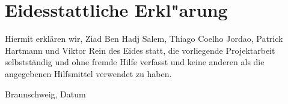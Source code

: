 \chapter*{Eidesstattliche Erkl"arung}\label{s:eid_erkl}


Hiermit erklären wir, Ziad Ben Hadj Salem, Thiago Coelho Jordao, Patrick Hartmann und Viktor Rein des Eides statt, die vorliegende Projektarbeit selbstständig und ohne
fremde Hilfe verfasst und keine anderen als die angegebenen Hilfsmittel verwendet zu
haben.

\vspace*{3cm}
Braunschweig, Datum
